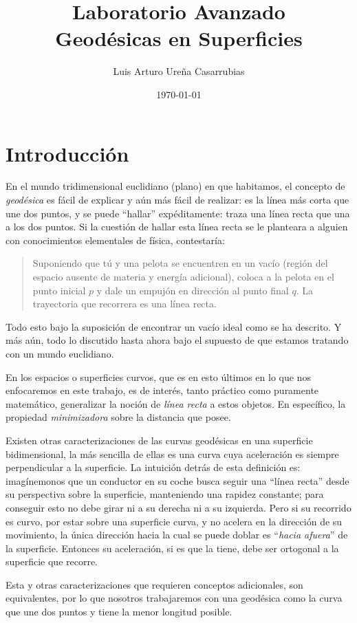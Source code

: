 \documentclass[11pt]{article}
\title{Laboratorio Avanzado\\
{\Large Geodésicas en Superficies}}
\author{Luis Arturo Ureña Casarrubias}
\date{\today}
\numberwithin{equation}{section}
\begin{document}
\maketitle

\tableofcontents

\newpage

\section{Introducción}
En el mundo tridimensional euclidiano (plano) en que habitamos, el concepto de \emph{geodésica} es fácil de explicar y aún más fácil de realizar: es la línea más corta que une dos puntos, y se puede ``hallar'' expéditamente: traza una línea recta que una a los dos puntos. Si la cuestión de hallar esta línea recta se le planteara a alguien con conocimientos elementales de física, contestaría:
\begin{quotation}
	Suponiendo que tú y una pelota se encuentren en un vacío (región del espacio ausente de materia y energía adicional), coloca a la pelota en el punto inicial $p$ y dale un empujón en dirección al punto final $q$. La trayectoria que recorrera es una línea recta.
\end{quotation}
Todo esto bajo la suposición de encontrar un vacío ideal como se ha descrito. Y más aún, todo lo discutido hasta ahora bajo el supuesto de que estamos tratando con un mundo euclidiano.

En los espacios o superficies curvos, que es en esto últimos en lo que nos enfocaremos en este trabajo, es de interés, tanto práctico como puramente matemático, generalizar la noción de \emph{línea recta} a estos objetos. En específico, la propiedad \emph{minimizadora} sobre la distancia que posee.

Existen otras caracterizaciones de las curvas geodésicas en una superficie bidimensional, la más sencilla de ellas es una curva cuya aceleración es siempre perpendicular a la superficie. La intuición detrás de esta definición es: imagínemonos que un conductor en su coche busca seguir una ``línea recta'' desde su perspectiva sobre la superficie, manteniendo una rapidez constante; para conseguir esto no debe girar ni a su derecha ni a su izquierda. Pero si su recorrido es curvo, por estar sobre una superficie curva, y no acelera en la dirección de su movimiento, la única dirección hacia la cual se puede doblar es ``\emph{hacia afuera}'' de la superficie. Entonces su aceleración, si es que la tiene, debe ser ortogonal a la superficie que recorre.

Esta y otras caracterizaciones que requieren conceptos adicionales, son equivalentes, por lo que nosotros trabajaremos con una geodésica como la curva que une dos puntos y tiene la menor longitud posible.












\newpage

\printbibliography
\nocite{}
\end{document}
